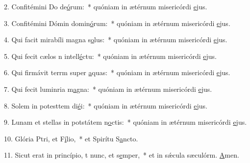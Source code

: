 2. Confitémini Do de\uline{ó}rum:~* quóniam in ætérnum misericórdi \uline{e}jus.\par 
3. Confitémini Dómin domin\uline{ó}rum:~* quóniam in ætérnum misericórdi \uline{e}jus.\par 
4. Qui facit mirabíli magna s\uline{o}lus:~* quóniam in ætérnum misericórdi \uline{e}jus.\par 
5. Qui fecit cælos n intell\uline{é}ctu:~* quóniam in ætérnum misericórdi \uline{e}jus.\par 
6. Qui firmávit terrm super \uline{a}quas:~* quóniam in ætérnum misericórdi \uline{e}jus.\par 
7. Qui fecit luminria m\uline{a}gna:~* quóniam in ætérnum misericórdi \uline{e}jus.\par 
8. Solem in potesttem di\uline{é}i:~* quóniam in ætérnum misericórdi \uline{e}jus.\par 
9. Lunam et stellas in potstátem n\uline{o}ctis:~* quóniam in ætérnum misericórdi \uline{e}jus.\par 
10. Glória Ptri, et F\uline{í}lio,~* et Spirítu S\uline{a}ncto.\par 
11. Sicut erat in princípio, t nunc, et s\uline{e}mper,~* et in sǽcula sæculórm. \uline{A}men.\par 
